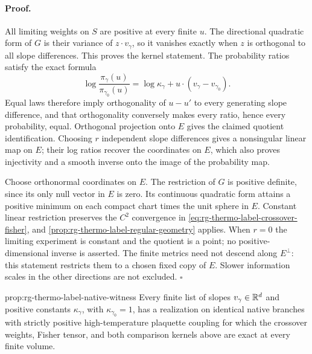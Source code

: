\paragraph{Proof.}
All limiting weights on $S$ are positive at every finite $u$.
The directional quadratic form of $G$ is their variance of
$z\cdot v_\gamma$, so it vanishes exactly when $z$ is orthogonal to
all slope differences. This proves the kernel statement. The
probability ratios satisfy the exact formula
\begin{equation}
 \log\frac{\pi_\gamma(u)}{\pi_{\gamma_0}(u)}
 =\log\kappa_\gamma+u\cdot(v_\gamma-v_{\gamma_0}).
 \label{eq:rg-thermo-label-quotient-ratios}
\end{equation}
Equal laws therefore imply orthogonality of $u-u'$ to every generating
slope difference, and that orthogonality conversely makes every ratio,
hence every probability, equal. Orthogonal projection onto $E$ gives
the claimed quotient identification. Choosing $r$ independent slope
differences gives a nonsingular linear map on $E$; their log ratios
recover the coordinates on $E$, which also proves injectivity and a
smooth inverse onto the image of the probability map.

Choose orthonormal coordinates on $E$. The restriction of $G$ is
positive definite, since its only null vector in $E$ is zero. Its
continuous quadratic form attains a positive minimum on each compact
chart times the unit sphere in $E$. Constant linear restriction
preserves the $C^2$ convergence in
\cref{eq:rg-thermo-label-crossover-fisher}, and
\cref{prop:rg-thermo-label-regular-geometry} applies. When $r=0$ the
limiting experiment is constant and the quotient is a point; no
positive-dimensional inverse is asserted. The finite metrics need not
descend along $E^\perp$: this statement restricts them to a chosen
fixed copy of $E$. Slower information scales in the other directions
are not excluded. $\square$

{prop:rg-thermo-label-native-witness}
Every finite list of slopes $v_\gamma\in\mathbb R^d$ and positive constants
$\kappa_\gamma$, with $\kappa_{\gamma_0}=1$, has a realization on
identical native branches with strictly positive high-temperature
plaquette coupling for which the crossover weights, Fisher tensor,
and both comparison kernels above are exact at every finite volume.\thermoestablishedstatus


